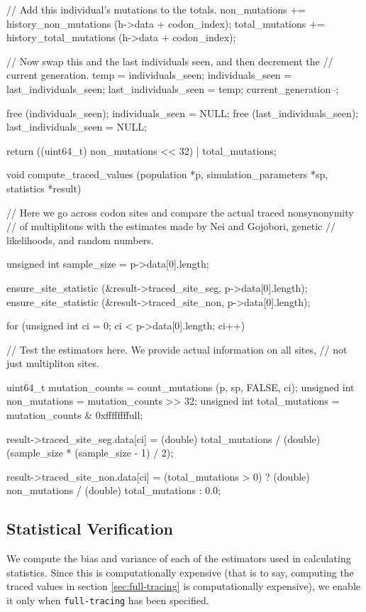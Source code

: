 \documentclass{article}
\begin{document}
\begin{ccode}
{{{        // Add this individual's mutations to the totals.
        non_mutations += history_non_mutations (h->data + codon_index);
        total_mutations += history_total_mutations (h->data + codon_index);
      }

    // Now swap this and the last individuals seen, and then decrement the
    // current generation.
    temp = individuals_seen;
    individuals_seen = last_individuals_seen;
    last_individuals_seen = temp;
    current_generation--;
  }

  free (individuals_seen);	individuals_seen	= NULL;
  free (last_individuals_seen); last_individuals_seen	= NULL;

  return ((uint64_t) non_mutations << 32) | total_mutations;
}

void compute_traced_values (population *p, simulation_parameters *sp, statistics *result) {
  // Here we go across codon sites and compare the actual traced nonsynonymity
  // of multiplitons with the estimates made by Nei and Gojobori, genetic
  // likelihoods, and random numbers.

  unsigned int sample_size = p->data[0].length;

  ensure_site_statistic (&result->traced_site_seg, p->data[0].length);
  ensure_site_statistic (&result->traced_site_non, p->data[0].length);

  for (unsigned int ci = 0; ci < p->data[0].length; ci++) {
    // Test the estimators here. We provide actual information on all sites,
    // not just multipliton sites.

    uint64_t		mutation_counts = count_mutations (p, sp, FALSE, ci);
    unsigned int	non_mutations   = mutation_counts >> 32;
    unsigned int	total_mutations = mutation_counts & 0xffffffffull;

    result->traced_site_seg.data[ci] = (double) total_mutations /
				       (double) (sample_size * (sample_size - 1) / 2);

    result->traced_site_non.data[ci] = (total_mutations > 0) ?
					 (double) non_mutations / (double) total_mutations :
					 0.0;
  }
}
\end{ccode}

    \subsection{Statistical Verification}
      \label{sec:statistical-verification}

      We compute the bias and variance of each of the estimators used in
      calculating statistics. Since this is computationally expensive (that is
      to say, computing the traced values in section \ref{sec:full-tracing} is
      computationally expensive), we enable it only when \verb|full-tracing| has
      been specified.
\end{document}

